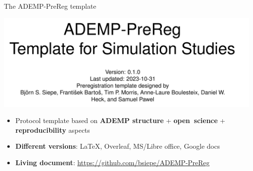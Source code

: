 \documentclass[english, 12pt, aspectratio=169]{beamer}
\begin{document}
\begin{frame}{The ADEMP-PreReg template}
  \begin{block}{}
  \centering
  \includegraphics[width = 0.6\linewidth,frame]{pics/ademprereg.png}

  \begin{itemize}
  \pause
    \item Protocol template based on \alert{\textbf{ADEMP structure}}
          \citep{Morris2019} + \alert{\textbf{open~science}} +
          \alert{\textbf{reproducibility}} aspects
    \pause
    \item \alert{\textbf{Different versions}}: \LaTeX, Overleaf, MS/Libre office, Google
    docs
    \pause
    \item \alert{\textbf{Living
          document}}:          \href{https://github.com/bsiepe/ADEMP-PreReg}{https://github.com/bsiepe/ADEMP-PreReg}
    \end{itemize}
  \end{block}

  \vspace{-1.5em}
  \nocite{Siepe2023}

\end{frame}
\end{document}
